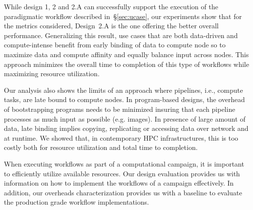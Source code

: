 While design 1, 2 and 2.A can successfully support the execution of the paradigmatic workflow described in~\S\ref{sec:ucase}, our experiments show that for the metrics considered, Design~2.A is the one offering the better overall performance.
Generalizing this result, use cases that are both data-driven and compute-intense benefit from early binding of data to compute node so to maximize data and compute affinity and equally balance input across nodes.
This approach minimizes the overall time to completion of this type of workflows while maximizing resource utilization.

Our analysis also shows the limits of an approach where pipelines, i.e., compute tasks, are late bound to compute nodes.
In program-based designs, the overhead of bootstrapping programs needs to be minimized insuring that each pipeline processes as much input as possible (e.g. images).
In presence of large amount of data, late binding implies copying, replicating or accessing data over network and at runtime.
We showed that, in contemporary HPC infrastructures, this is too costly both for resource utilization and total time to completion.

When executing workflows as part of a computational campaign, it is important to efficiently utilize available resources.
Our design evaluation provides us with information on how to implement the workflows of a campaign effectively.
In addition, our overheads characterization provides us with a baseline to evaluate the production grade workflow implementations.







